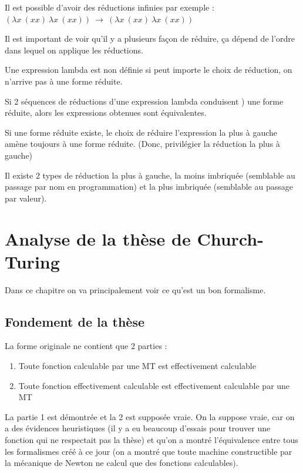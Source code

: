 \begin{myrem}
	Il est possible d'avoir des réductions infinies par exemple : 
	$(\lambda x\ (xx)\ \lambda x \ (xx)) \ \rightarrow \ (\lambda x\ (xx) \  
\lambda x \ (xx))$
\end{myrem}

\begin{myrem}
	Il est important de voir qu'il y a plusieurs façon de réduire, ça 
	dépend de l'ordre dans lequel on applique les réductions.
\end{myrem}

\begin{myprop}
	Une expression lambda est non définie si peut importe le choix de 
	réduction, on n’arrive pas à une forme réduite.
\end{myprop}

\begin{mytheo} Si 2 séquences de réductions d'une expression 
	lambda conduisent ) une forme réduite, alors les expressions obtenues 
	sont équivalentes.
\end{mytheo}

\begin{myprop}
	Si une forme réduite existe, le choix de réduire l'expression la plus à 
	gauche amène toujours à une forme réduite. (Donc, privilégier la 
	réduction la plus à gauche)
\end{myprop}

\begin{myrem}
	Il existe 2 types de réduction la plus à gauche, la moins imbriquée 
	(semblable au passage par nom en programmation) et la plus imbriquée 
	(semblable au passage par valeur).
\end{myrem}

\section{Analyse de la thèse de Church-Turing}
\label{sec:analyse_de_la_th_se_de_church_turing}
Dans ce chapitre on va principalement voir ce qu'est un bon formalisme.

\subsection{Fondement de la thèse}
\label{sub:fondement_de_la_th_se}
La forme originale ne contient que 2 parties :
\begin{enumerate}
	\item Toute fonction calculable par une MT est effectivement calculable
	\item Toute fonction effectivement calculable est effectivement 
		calculable par une MT 
\end{enumerate}
La partie 1 est démontrée et la 2 est supposée vraie. 
On la suppose vraie, car on a des évidences heuristiques (il y a eu beaucoup 
d'essais pour trouver une fonction qui ne respectait pas la thèse) et qu'on a montré 
l'équivalence entre tous les formalismes créé à ce jour (on a montré que toute 
machine constructible par la mécanique de Newton ne calcul que des fonctions 
calculables). 

